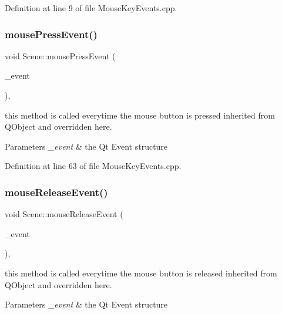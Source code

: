 Definition at line 9 of file Mouse\+Key\+Events.\+cpp.

\mbox{\label{class_scene_abbdfcf09ecb09960220697d723d28bc8}} 
\subsubsection{mousePressEvent()}
{\footnotesize\ttfamily void Scene\+::mouse\+Press\+Event (\begin{DoxyParamCaption}\item[{Q\+Mouse\+Event $\ast$}]{\+\_\+event }\end{DoxyParamCaption})\hspace{0.3cm}{\ttfamily [override]}, {\ttfamily [private]}}



this method is called everytime the mouse button is pressed inherited from Q\+Object and overridden here. 


\begin{DoxyParams}{Parameters}
{\em \+\_\+event} & the Qt Event structure \\
\hline
\end{DoxyParams}


Definition at line 63 of file Mouse\+Key\+Events.\+cpp.

\mbox{\label{class_scene_ae6979da5a735ac7df4eb3dd50418e704}} 
\subsubsection{mouseReleaseEvent()}
{\footnotesize\ttfamily void Scene\+::mouse\+Release\+Event (\begin{DoxyParamCaption}\item[{Q\+Mouse\+Event $\ast$}]{\+\_\+event }\end{DoxyParamCaption})\hspace{0.3cm}{\ttfamily [override]}, {\ttfamily [private]}}



this method is called everytime the mouse button is released inherited from Q\+Object and overridden here. 


\begin{DoxyParams}{Parameters}
{\em \+\_\+event} & the Qt Event structure \\
\hline
\end{DoxyParams}


